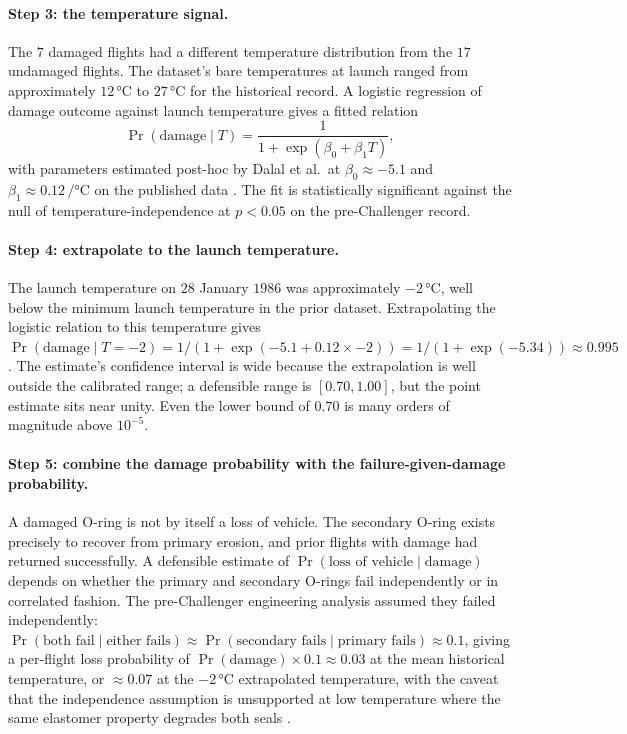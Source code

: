 \paragraph{Step 3: the temperature signal.}
The $7$ damaged flights had a different temperature distribution
from the $17$ undamaged flights. The dataset's bare temperatures at
launch ranged from approximately $12 \,\si{\degreeCelsius}$ to
$27 \,\si{\degreeCelsius}$ for the historical record. A logistic
regression of damage outcome against launch temperature gives a
fitted relation
\[
\Pr(\text{damage} \mid T) = \frac{1}{1 + \exp(\beta_{0} + \beta_{1}
T)},
\]
with parameters estimated post-hoc by Dalal et al.\ at $\beta_{0}
\approx -5.1$ and $\beta_{1} \approx 0.12 \,\si{\per\degreeCelsius}$
on the published data \cite{ch09-paper:dalal-challenger-1989}. The
fit is statistically significant against the null of
temperature-independence at $p < 0.05$ on the pre-Challenger
record.

\paragraph{Step 4: extrapolate to the launch temperature.}
The launch temperature on $28$ January $1986$ was approximately
$-2 \,\si{\degreeCelsius}$, well below the minimum launch
temperature in the prior dataset. Extrapolating the logistic
relation to this temperature gives $\Pr(\text{damage} \mid T =
-2) = 1 / (1 + \exp(-5.1 + 0.12 \times -2)) = 1 / (1 + \exp(-5.34))
\approx 0.995$. The estimate's confidence interval is wide because
the extrapolation is well outside the calibrated range; a defensible
range is $[0.70, 1.00]$, but the point estimate sits near unity.
Even the lower bound of $0.70$ is many orders of magnitude above
$10^{-5}$.

\paragraph{Step 5: combine the damage probability with the
failure-given-damage probability.}
A damaged O-ring is not by itself a loss of vehicle. The secondary
O-ring exists precisely to recover from primary erosion, and prior
flights with damage had returned successfully. A defensible
estimate of $\Pr(\text{loss of vehicle} \mid \text{damage})$ depends
on whether the primary and secondary O-rings fail independently or
in correlated fashion. The pre-Challenger engineering analysis
assumed they failed independently: $\Pr(\text{both fail} \mid
\text{either fails}) \approx \Pr(\text{secondary fails} \mid
\text{primary fails}) \approx 0.1$, giving a per-flight loss
probability of $\Pr(\text{damage}) \times 0.1 \approx 0.03$ at the
mean historical temperature, or $\approx 0.07$ at the
$-2 \,\si{\degreeCelsius}$ extrapolated temperature, with the
caveat that the independence assumption is unsupported at low
temperature where the same elastomer property degrades both seals
\cite{ch09-paper:dalal-challenger-1989}.

